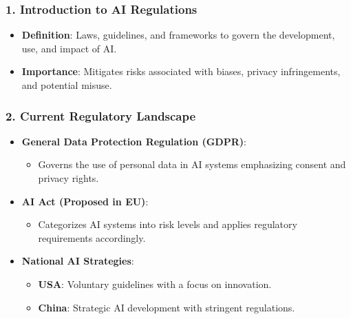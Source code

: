 \documentclass[aspectratio=169]{beamer}
\begin{document}
\begin{frame}[fragile]
    \frametitle{1. Introduction to AI Regulations}
    \begin{itemize}
        \item \textbf{Definition}: Laws, guidelines, and frameworks to govern the development, use, and impact of AI.
        \item \textbf{Importance}: Mitigates risks associated with biases, privacy infringements, and potential misuse.
    \end{itemize}
\end{frame}

\begin{frame}[fragile]
    \frametitle{2. Current Regulatory Landscape}
    \begin{itemize}
        \item \textbf{General Data Protection Regulation (GDPR)}: 
        \begin{itemize}
            \item Governs the use of personal data in AI systems emphasizing consent and privacy rights.
        \end{itemize}

        \item \textbf{AI Act (Proposed in EU)}: 
        \begin{itemize}
            \item Categorizes AI systems into risk levels and applies regulatory requirements accordingly.
        \end{itemize}

        \item \textbf{National AI Strategies}:
        \begin{itemize}
            \item \textbf{USA}: Voluntary guidelines with a focus on innovation.
            \item \textbf{China}: Strategic AI development with stringent regulations.
        \end{itemize}
    \end{itemize}
\end{frame}
\end{document}
